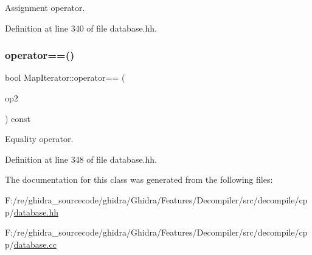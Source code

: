 Assignment operator. 



Definition at line 340 of file database.\+hh.

\mbox{\label{class_map_iterator_a151d7bd51ce682e79ced5a8552132bdc}} 
\subsubsection{\texorpdfstring{operator==()}{operator==()}}
{\footnotesize\ttfamily bool Map\+Iterator\+::operator== (\begin{DoxyParamCaption}\item[{const \mbox{\hyperlink{class_map_iterator}{Map\+Iterator}} \&}]{op2 }\end{DoxyParamCaption}) const\hspace{0.3cm}{\ttfamily [inline]}}



Equality operator. 



Definition at line 348 of file database.\+hh.



The documentation for this class was generated from the following files\+:\begin{DoxyCompactItemize}
\item 
F\+:/re/ghidra\+\_\+sourcecode/ghidra/\+Ghidra/\+Features/\+Decompiler/src/decompile/cpp/\mbox{\hyperlink{database_8hh}{database.\+hh}}\item 
F\+:/re/ghidra\+\_\+sourcecode/ghidra/\+Ghidra/\+Features/\+Decompiler/src/decompile/cpp/\mbox{\hyperlink{database_8cc}{database.\+cc}}\end{DoxyCompactItemize}
